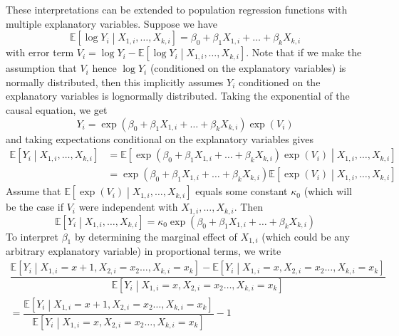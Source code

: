 \documentclass[11pt]{report} %
\begin{document}
These interpretations can be extended to population regression functions with multiple explanatory variables. Suppose we have
\begin{equation}
\mathbb{E}\left[\log Y_{i}\middle|X_{1, i}, \dots, X_{k, i}\right] = \beta_{0} + \beta_{1}X_{1, i} + \dots + \beta_{k}X_{k, i}
\end{equation}
with error term $V_{i} = \log Y_{i} - \mathbb{E}\left[\log Y_{i}\middle|X_{1, i}, \dots, X_{k, i}\right]$. Note that if we make the assumption that $V_{i}$ hence $\log Y_{i}$ (conditioned on the explanatory variables) is normally distributed, then this implicitly assumes $Y_{i}$ conditioned on the explanatory variables is lognormally distributed. Taking the exponential of the causal equation, we get
\begin{equation}
Y_{i} = \exp\left(\beta_{0} + \beta_{1}X_{1, i} + \dots + \beta_{k}X_{k, i}\right)\exp\left(V_{i}\right)
\end{equation}
and taking expectations conditional on the explanatory variables gives
\begin{align}
\mathbb{E}\left[Y_{i}\middle|X_{1, i}, \dots, X_{k, i}\right] &= \mathbb{E}\left[\exp\left(\beta_{0} + \beta_{1}X_{1, i} + \dots + \beta_{k}X_{k, i}\right)\exp\left(V_{i}\right)\middle|X_{1, i}, \dots, X_{k, i}\right] \\
&= \exp\left(\beta_{0} + \beta_{1}X_{1, i} + \dots + \beta_{k}X_{k, i}\right)\mathbb{E}\left[\exp\left(V_{i}\right)\middle|X_{1, i}, \dots, X_{k, i}\right]
\end{align}
Assume that $\mathbb{E}\left[\exp\left(V_{i}\right)\middle|X_{1, i}, \dots, X_{k, i}\right]$ equals some constant $\kappa_{0}$ (which will be the case if $V_{i}$ were independent with $X_{1, i}, \dots, X_{k, i}$. Then
\begin{equation}
\mathbb{E}\left[Y_{i}\middle|X_{1, i}, \dots, X_{k, i}\right] = \kappa_{0}\exp\left(\beta_{0} + \beta_{1}X_{1, i} + \dots + \beta_{k}X_{k, i}\right)
\end{equation}
To interpret $\beta_{1}$ by determining the marginal effect of $X_{1, i}$ (which could be any arbitrary explanatory variable) in proportional terms, we write
\begin{multline}
\dfrac{\mathbb{E}\left[Y_{i}\middle|X_{1,i}=x+1,X_{2,i}=x_{2}\dots,X_{k,i}=x_{k}\right]-\mathbb{E}\left[Y_{i}\middle|X_{1,i}=x,X_{2,i}=x_{2}\dots,X_{k,i}=x_{k}\right]}{\mathbb{E}\left[Y_{i}\middle|X_{1,i}=x,X_{2,i}=x_{2}\dots,X_{k,i}=x_{k}\right]} \\
= \dfrac{\mathbb{E}\left[Y_{i}\middle|X_{1,i}=x+1,X_{2,i}=x_{2}\dots,X_{k,i}=x_{k}\right]}{\mathbb{E}\left[Y_{i}\middle|X_{1,i}=x,X_{2,i}=x_{2}\dots,X_{k,i}=x_{k}\right]}-1
\end{multline}
\end{document}
